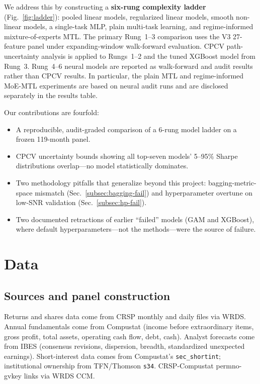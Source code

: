 \documentclass[11pt]{article}
\begin{document}
We address this by constructing a \textbf{six-rung complexity ladder}
(Fig.~\ref{fig:ladder}): pooled linear models, regularized linear
models, smooth non-linear models, a single-task MLP, plain
multi-task learning, and regime-informed mixture-of-experts MTL. The
primary Rung~1--3 comparison uses the V3 27-feature panel under
expanding-window walk-forward evaluation. CPCV path-uncertainty
analysis is applied to Rungs~1--2 and the tuned XGBoost model from
Rung~3. Rung~4--6 neural models are reported as walk-forward and audit
results rather than CPCV results. In particular, the plain MTL and
regime-informed MoE-MTL experiments are based on neural audit runs and
are disclosed separately in the results table.

Our contributions are fourfold:
\begin{itemize}[leftmargin=2em,topsep=2pt,itemsep=2pt]
\item A reproducible, audit-graded comparison of a 6-rung model ladder
  on a frozen 119-month panel.
\item CPCV uncertainty bounds showing all top-seven models' 5--95\%
  Sharpe distributions overlap---no model statistically dominates.
\item Two methodology pitfalls that generalize beyond this project:
  bagging-metric-space mismatch (Sec.~\ref{subsec:bagging-fail}) and
  hyperparameter overtune on low-SNR validation
  (Sec.~\ref{subsec:hp-fail}).
\item Two documented retractions of earlier ``failed'' models (GAM and
  XGBoost), where default hyperparameters---not the methods---were the
  source of failure.
\end{itemize}

\section{Data}\label{sec:data}

\subsection{Sources and panel construction}

Returns and shares data come from CRSP monthly and daily files via
WRDS. Annual fundamentals come from Compustat (income before
extraordinary items, gross profit, total assets, operating cash flow,
debt, cash). Analyst forecasts come from IBES (consensus revisions,
dispersion, breadth, standardized unexpected earnings).
Short-interest data comes from Compustat's
\texttt{sec\_shortint}; institutional ownership from
TFN/Thomson \texttt{s34}. CRSP-Compustat permno-gvkey links via WRDS
CCM.
\end{document}
